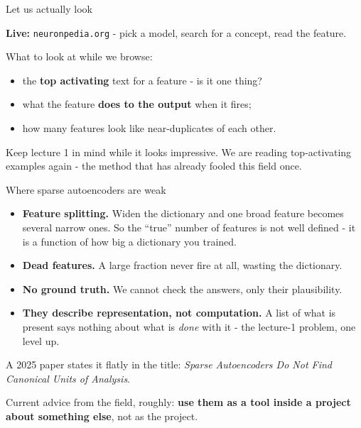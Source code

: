 \documentclass[aspectratio=169]{beamer}
\newcommand{\trapbox}[1]{%
  \begin{tcolorbox}[colback=armred!8, colframe=armred, boxrule=0.6pt, arc=2pt]
  #1
  \end{tcolorbox}}
\newcommand{\takebox}[1]{%
  \begin{tcolorbox}[colback=paramgreen!8, colframe=paramgreen, boxrule=0.6pt, arc=2pt]
  #1
  \end{tcolorbox}}
\newcommand{\watchbox}[1]{%
  \begin{tcolorbox}[colback=armorange!12, colframe=armorange, boxrule=0.6pt, arc=2pt]
  #1
  \end{tcolorbox}}
\newcommand{\demobox}[1]{%
  \begin{center}
  \begin{tcolorbox}[colback=violet1!8, colframe=violet1, boxrule=0.7pt, arc=2pt,
                    width=0.9\textwidth]
    \centering\textbf{Live:} #1
  \end{tcolorbox}
  \end{center}}
\begin{document}
\begin{frame}{Let us actually look}
  \vspace{1.0em}
  \demobox{\texttt{neuronpedia.org} - pick a model, search for a concept, read the feature.}

  \vspace{1.0em}
  What to look at while we browse:

  \vspace{0.5em}
  \begin{itemize}
    \item the \textbf{top activating} text for a feature - is it one thing?
    \item what the feature \textbf{does to the output} when it fires;
    \item how many features look like near-duplicates of each other.
  \end{itemize}

  \vspace{0.9em}
  \watchbox{Keep lecture 1 in mind while it looks impressive. We are reading top-activating
  examples again - the method that has already fooled this field once.}
\end{frame}

\begin{frame}{Where sparse autoencoders are weak}
  \vspace{0.5em}
  \begin{itemize}
    \item \textbf{Feature splitting.} Widen the dictionary and one broad feature becomes several
      narrow ones. So the ``true'' number of features is not well defined - it is a function of
      how big a dictionary you trained.
    \item \textbf{Dead features.} A large fraction never fire at all, wasting the dictionary.
    \item \textbf{No ground truth.} We cannot check the answers, only their plausibility.
    \item \textbf{They describe representation, not computation.} A list of what is present says
      nothing about what is \emph{done} with it - the lecture-1 problem, one level up.
  \end{itemize}

  \vspace{0.5em}
  \trapbox{\small A 2025 paper states it flatly in the title: \emph{Sparse Autoencoders Do Not
  Find Canonical Units of Analysis}.}

  \vspace{0.4em}
  \takebox{\small Current advice from the field, roughly: \textbf{use them as a tool inside a
  project about something else}, not as the project.}
\end{frame}
\end{document}

